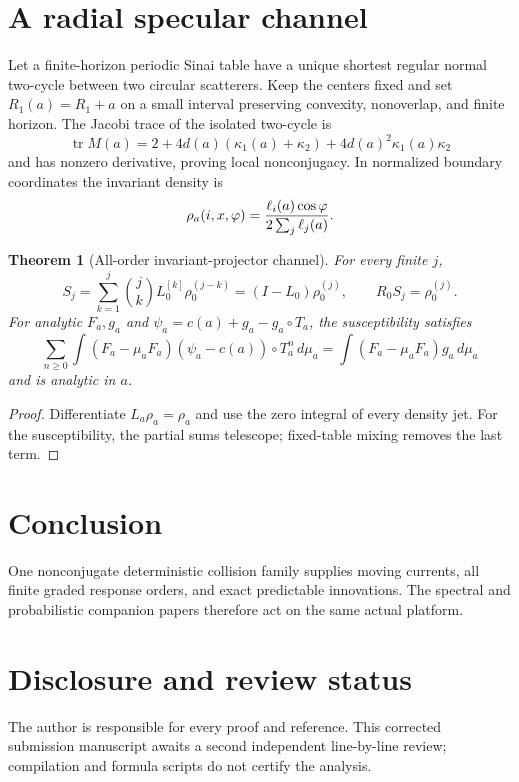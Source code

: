 \documentclass[11pt,reqno]{amsart}
\newtheorem{theorem}{Theorem}[section]
\theoremstyle{definition}
\theoremstyle{remark}
\begin{document}
\section{A radial specular channel}\label{sec:specular}
Let a finite-horizon periodic Sinai table have a unique shortest regular
normal two-cycle between two circular scatterers.  Keep the centers fixed and
set $R_1(a)=R_1+a$ on a small interval preserving convexity, nonoverlap, and
finite horizon.  The Jacobi trace of the isolated two-cycle is
\[
 \operatorname{tr}M(a)=2+4d(a)(\kappa_1(a)+\kappa_2)
 +4d(a)^2\kappa_1(a)\kappa_2
\]
and has nonzero derivative, proving local nonconjugacy.  In normalized boundary
coordinates the invariant density is
\[
 \rho_a(i,x,\varphi)=
 {\ell_i(a)\cos\varphi\over2\sum_j\ell_j(a)}.
\]

\begin{theorem}[All-order invariant-projector channel]\label{thm:specular}
For every finite $j$,
\[
 S_j=\sum_{k=1}^j{j\choose k}L_0^{[k]}\rho_0^{(j-k)}
 =(I-L_0)\rho_0^{(j)},
 \qquad R_0S_j=\rho_0^{(j)}.
\]
For analytic $F_a,g_a$ and
$\psi_a=c(a)+g_a-g_a\circ T_a$, the susceptibility satisfies
\[
 \sum_{n\ge0}\int(F_a-\mu_aF_a)
 (\psi_a-c(a))\circ T_a^n\,d\mu_a
 =\int(F_a-\mu_aF_a)g_a\,d\mu_a
\]
and is analytic in $a$.
\end{theorem}

\begin{proof}
Differentiate $L_a\rho_a=\rho_a$ and use the zero integral of every density
jet.  For the susceptibility, the partial sums telescope; fixed-table mixing
removes the last term.
\end{proof}

\section{Conclusion}
One nonconjugate deterministic collision family supplies moving currents, all
finite graded response orders, and exact predictable innovations.  The
spectral and probabilistic companion papers therefore act on the same actual
platform.

\section*{Disclosure and review status}
The author is responsible for every proof and reference.  This corrected
submission manuscript awaits a second independent line-by-line review;
compilation and formula scripts do not certify the analysis.



\end{document}
